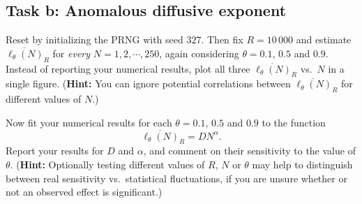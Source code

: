 \documentclass[12 pt]{article} %
\newcommand{\al}{\ensuremath{\alpha} }
\newcommand{\showmarks}[1]{\rightline{\texttt{[#1 marks]}}} %
\begin{document}
\showmarks{12}

\subsection*{Task b: Anomalous diffusive exponent}
Reset by initializing the PRNG with seed $327$.
Then fix $R = 10\,000$ and estimate $\overline{\ell_{\theta}(N)}_R$ for \textit{every} $N = 1, 2, \cdots, 250$, again considering $\theta = 0.1$, $0.5$ and $0.9$.
Instead of reporting your numerical results, plot all three $\overline{\ell_{\theta}(N)}_R$ vs.\ $N$ in a single figure.
(\textbf{Hint:} You can ignore potential correlations between $\overline{\ell_{\theta}(N)}_R$ for different values of $N$.)

\showmarks{8}

Now fit your numerical results for each $\theta = 0.1$, $0.5$ and $0.9$ to the function
\begin{equation*}
  \overline{\ell_{\theta}(N)}_R = D N^{\al}.
\end{equation*}
Report your results for $D$ and $\al$, and comment on their sensitivity to the value of $\theta$.
(\textbf{Hint:} Optionally testing different values of $R$, $N$ or $\theta$ may help to distinguish between real sensitivity vs.\ statistical fluctuations, if you are unsure whether or not an observed effect is significant.)

\showmarks{10}



\end{document}
